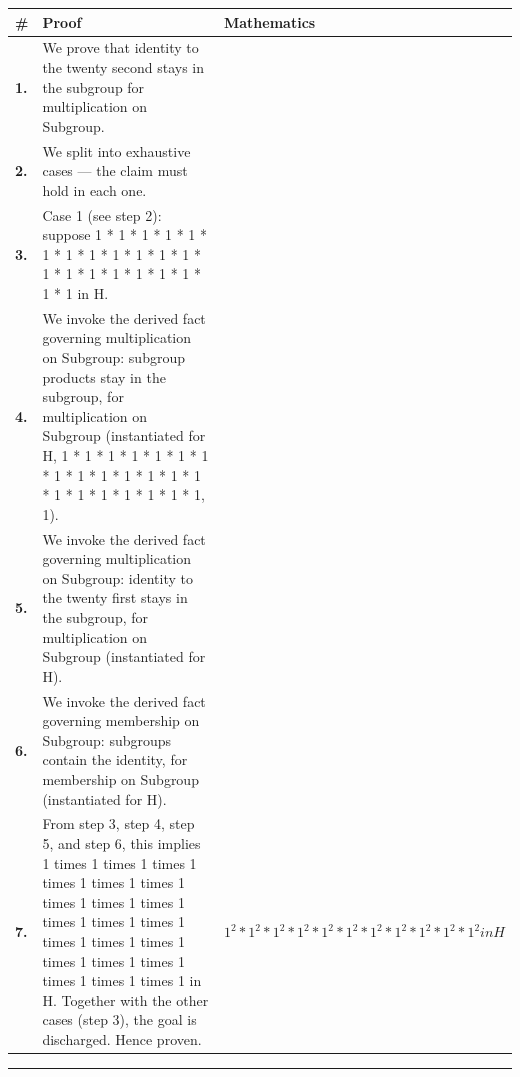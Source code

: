 \documentclass[11pt]{article}
\theoremstyle{definition}
\begin{document}
\begin{tabular}{@{} >{\raggedright\arraybackslash}p{} >{\raggedright\arraybackslash}p{} >{\raggedleft\arraybackslash}p{} @{}}
\textbf{\#} & \textbf{Proof} & \textbf{Mathematics} \\
\midrule
\textbf{1.} & We prove that identity to the twenty second stays in the subgroup for multiplication on Subgroup. & \\[0.45em]
\textbf{2.} & We split into exhaustive cases — the claim must hold in each one. & \\[0.45em]
\textbf{3.} & Case 1 (see step 2): suppose 1 * 1 * 1 * 1 * 1 * 1 * 1 * 1 * 1 * 1 * 1 * 1 * 1 * 1 * 1 * 1 * 1 * 1 * 1 * 1 * 1 in H. & \\[0.45em]
\textbf{4.} & We invoke the derived fact governing multiplication on Subgroup: subgroup products stay in the subgroup, for multiplication on Subgroup (instantiated for H, 1 * 1 * 1 * 1 * 1 * 1 * 1 * 1 * 1 * 1 * 1 * 1 * 1 * 1 * 1 * 1 * 1 * 1 * 1 * 1 * 1, 1). & \\[0.45em]
\textbf{5.} & We invoke the derived fact governing multiplication on Subgroup: identity to the twenty first stays in the subgroup, for multiplication on Subgroup (instantiated for H). & \\[0.45em]
\textbf{6.} & We invoke the derived fact governing membership on Subgroup: subgroups contain the identity, for membership on Subgroup (instantiated for H). & \\[0.45em]
\textbf{7.} & From step 3, step 4, step 5, and step 6, this implies 1 times 1 times 1 times 1 times 1 times 1 times 1 times 1 times 1 times 1 times 1 times 1 times 1 times 1 times 1 times 1 times 1 times 1 times 1 times 1 times 1 times 1 in H. Together with the other cases (step 3), the goal is discharged. Hence proven. & $\displaystyle 1^{2} * 1^{2} * 1^{2} * 1^{2} * 1^{2} * 1^{2} * 1^{2} * 1^{2} * 1^{2} * 1^{2} * 1^{2} in H$ \\[0.45em]
\bottomrule
\end{tabular}
\label{thm:Subgroup-multiplication-identity_to_the_twenty_second_stays_in_the_subgroup}
\par\medskip\hrule
\end{document}
